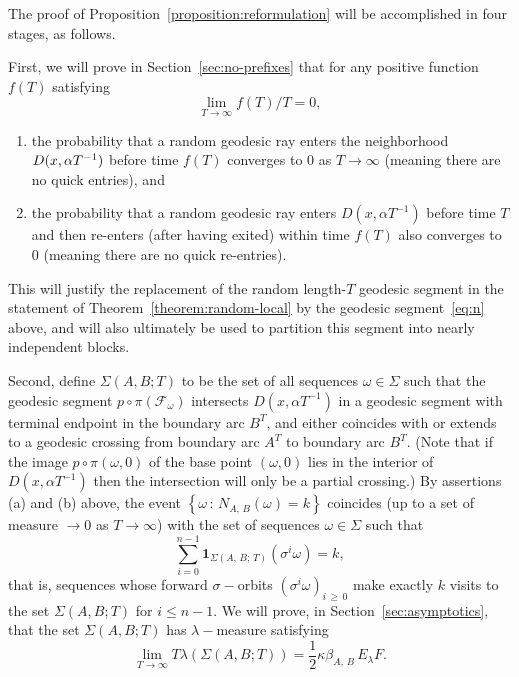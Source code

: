 \documentclass[AHL, Unicode, longabstracts, published]{cedram}
\newcommand{\xset}[1]{\left\{ #1 \right\}}
\newcommand*{\alphenumi}{\renewcommand*{\theenumi}{\alph{enumi}}}
\begin{document}
The proof of Proposition~\ref{proposition:reformulation} will be accomplished in four stages, as follows.

First, we will prove in Section~\ref{sec:no-prefixes} that for any positive function $f(T)$ satisfying
\[
\lim_{T \rightarrow \infty}f(T)/T=0,
\]
\begin{enumerate}\alphenumi
\item \label{list4.1.1}the probability that a random geodesic ray enters the neighborhood $D(x,\linebreak\alpha T^{-1})$ before time $f(T)$ converges to $0$ as $T \rightarrow\infty$ (meaning there are no quick entries), and
\item \label{list4.1.2}the probability that a random geodesic ray enters $D(x, \alpha T^{-1})$ before time $T$ and then re-enters (after having exited) within time $f(T)$ also converges to $0$ (meaning there are no quick re-entries).
\end{enumerate}
This will justify the replacement of the random length-$T$ geodesic segment in the statement of Theorem~\ref{theorem:random-local} by the geodesic segment~\eqref{eq:n} above, and will also ultimately be used to partition this segment into nearly independent blocks.


Second, define $\Sigma (A,B;T)$ to be the set of all sequences $\omega \in \Sigma$ such that the geodesic segment $p\circ\pi(\mathcal{F}_{\omega})$ intersects $D(x, \alpha T^{-1})$ in a geodesic segment with terminal endpoint in the boundary arc $B^{T}$, and either coincides with or extends to a geodesic crossing from boundary arc $A^{T}$ to boundary arc $B^{T}$. (Note that if the image $p\circ\pi (\omega,0)$ of the base point $(\omega,0)$ lies in the interior of $D(x, \alpha T^{-1})$ then the intersection will only be a partial crossing.) By assertions (a) and (b) above, the event $\xset {\omega \,:\, N_{A,\,B}(\omega)=k}$ coincides (up to a set of measure $\rightarrow 0$ as $T \rightarrow \infty$) with the set of sequences $\omega \in \Sigma$ such that
\[
\sum_{i=0}^{n-1}\mathbf{1} _{\Sigma(A,\,B;\,T)}(\sigma^{i}\omega)=k,
\]
that is, sequences whose forward $\sigma-$orbits $(\sigma^{i}\omega)_{i\,\geq\,0}$ make exactly $k$ visits to the set $\Sigma(A,B;T)$ for $i \leq n-1$. We will prove, in Section~\ref{sec:asymptotics}, that the set $\Sigma(A,B;T)$ has $\lambda-$measure satisfying
\begin{equation}\label{eq:measure-asymptotics}
\lim_{T \rightarrow \infty} T\lambda (\Sigma (A,B;T))=  \frac{1}{2} \kappa \beta_{A,\,B}\,E_{\lambda}F.
\end{equation}
\end{document}
